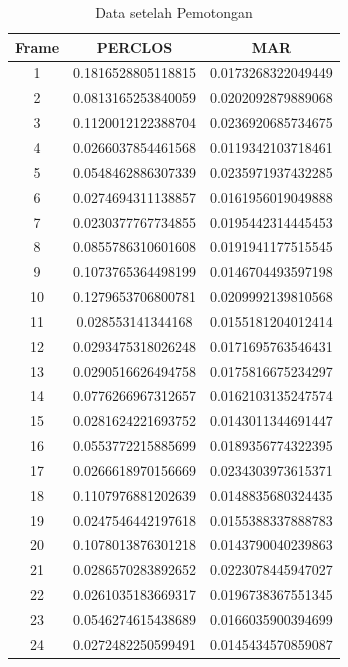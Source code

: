 \begin{longtable}{|c|c|c|}
  \hline
\end{longtable}

\begin{longtable}{|c|c|c|}
  \caption{Data setelah Pemotongan}
  \label{tb:setelahPemotongan}                                   \\
  \hline
  \rowcolor[HTML]{C0C0C0}
  \textbf{Frame} & \textbf{PERCLOS} & \textbf{MAR} \\
  \hline
  1   & 0.1816528805118815 & 0.0173268322049449 \\
  2   & 0.0813165253840059 & 0.0202092879889068 \\
  3   & 0.1120012122388704 & 0.0236920685734675 \\
  4   & 0.0266037854461568 & 0.0119342103718461 \\
  5   & 0.0548462886307339 & 0.0235971937432285 \\
  6   & 0.0274694311138857 & 0.0161956019049888 \\
  7   & 0.0230377767734855 & 0.0195442314445453 \\
  8   & 0.0855786310601608 & 0.0191941177515545 \\
  9   & 0.1073765364498199 & 0.0146704493597198 \\
  10  & 0.1279653706800781 & 0.0209992139810568 \\
  11  & 0.028553141344168  & 0.0155181204012414 \\
  12  & 0.0293475318026248 & 0.0171695763546431 \\
  13  & 0.0290516626494758 & 0.0175816675234297 \\
  14  & 0.0776266967312657 & 0.0162103135247574 \\
  15  & 0.0281624221693752 & 0.0143011344691447 \\
  16  & 0.0553772215885699 & 0.0189356774322395 \\
  17  & 0.0266618970156669 & 0.0234303973615371 \\
  18  & 0.1107976881202639 & 0.0148835680324435 \\
  19  & 0.0247546442197618 & 0.0155388337888783 \\
  20  & 0.1078013876301218 & 0.0143790040239863 \\
  21  & 0.0286570283892652 & 0.0223078445947027 \\
  22  & 0.0261035183669317 & 0.0196738367551345 \\
  23  & 0.0546274615438689 & 0.0166035900394699 \\
  24  & 0.0272482250599491 & 0.0145434570859087 \\

\end{longtable}
